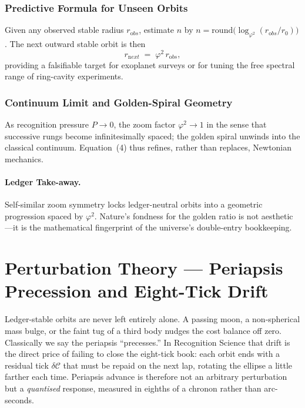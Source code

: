 \documentclass[11pt,oneside]{book}
\begin{document}
\subsubsection{Predictive Formula for Unseen Orbits}
\label{ss:phi2-predict}

Given any observed stable radius $r_{\mathrm obs}$, estimate $n$ by
$n=\mathrm{round}\!\bigl( \log_{\varphi^{2}}(r_{\mathrm obs}/r_{0})\bigr)$.
The next outward stable orbit is then
\[
   r_{\mathrm next}
   \;=\;
   \varphi^{2}\,r_{\mathrm obs},
   \tag{6}
\]
providing a falsifiable target for exoplanet surveys or for tuning the
free spectral range of ring-cavity experiments.

\subsubsection{Continuum Limit and Golden-Spiral Geometry}
\label{ss:phi2-continuum}

As recognition pressure $P\!\to\!0$, the zoom factor
$\varphi^{2}\!\to\!1$ in the sense that successive rungs become
infinitesimally spaced; the golden spiral unwinds into the classical
continuum.  Equation~(4) thus refines, rather than replaces, Newtonian
mechanics.

\paragraph{Ledger Take-away.}
Self-similar zoom symmetry locks ledger-neutral orbits into a geometric
progression spaced by $\varphi^{2}$.  Nature’s fondness for the golden
ratio is not aesthetic—it is the mathematical fingerprint of the
universe’s double-entry bookkeeping.

\section{Perturbation Theory — Periapsis Precession and Eight-Tick Drift}
\label{sec:periapsis-precession}

Ledger-stable orbits are never left entirely alone.  
A passing moon, a non-spherical mass bulge, or the faint tug of a
third body nudges the cost balance off zero.  
Classically we say the periapsis “precesses.”  
In Recognition Science that drift is the direct price of failing to
close the eight-tick book: each orbit ends with a residual tick
\(\delta\!\mathcal C\) that must be repaid on the next lap, rotating
the ellipse a little farther each time.  
Periapsis advance is therefore not an arbitrary perturbation but a
\emph{quantised} response, measured in eighths of a chronon rather
than arc-seconds.
\end{document}
